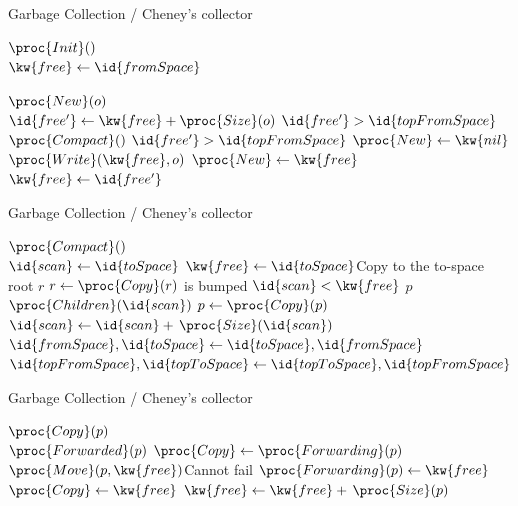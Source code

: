 \documentclass[compress,dvipdfmx]{beamer}
\begin{document}
%
\begin{frame}{Garbage Collection / Cheney's collector}

  \begin{codebox}
    \(\proc{Init}()\)\\
    \li \(\kw{free} \gets \id{fromSpace}\)
  \end{codebox}

  \begin{codebox}
    \(\proc{New}(o)\)\\
    \li \(\id{free'} \gets \kw{free} + \proc{Size}(o)\)
    \li {} \(\id{free'} > \id{topFromSpace}\)  \(\proc{Compact}()\)
    \li \If \(\id{free'} > \id{topFromSpace}\)
    \li \Then \(\proc{New} \gets \kw{nil}\)
    \li \Else \(\proc{Write}(\kw{free}, o)\)
    \li       \(\proc{New} \gets \kw{free}\)
    \li       \(\kw{free} \gets \id{free'}\)
        \End
  \end{codebox}

\end{frame}

%
\begin{frame}{Garbage Collection / Cheney's collector}

  \begin{codebox}
    \(\proc{Compact}()\)\\
    \li \(\id{scan} \gets \id{toSpace}\)
    \li \(\kw{free} \gets \id{toSpace}\)\RComment Copy to the to-space
    \li \For {} root \(r\)  \(r \gets
    \proc{Copy}(r)\)\RComment {} is bumped
    \li \While \(\id{scan} < \kw{free}\) 
    \li \> \For {} \(p\)  \(\proc{Children}(\id{scan})\) 
              \(p \gets \proc{Copy}(p)\)
    \li \> \(\id{scan} \gets \id{scan} + \, \proc{Size}(\id{scan})\)
    \li \(\id{fromSpace}, \id{toSpace} \gets \id{toSpace}, \id{fromSpace}\)
    \li \(\id{topFromSpace}, \id{topToSpace} \gets \id{topToSpace},
    \id{topFromSpace}\)
  \end{codebox}

\end{frame}

%
\begin{frame}{Garbage Collection / Cheney's collector}

  \begin{codebox}
    \(\proc{Copy}(p)\)\\
    \li \If \(\proc{Forwarded}(p)\)
    \li \Then \(\proc{Copy} \gets \proc{Forwarding}(p)\)
    \li \Else \(\proc{Move}(p, \kw{free})\)\RComment Cannot fail
    \li       \(\proc{Forwarding}(p) \gets \kw{free}\)
    \li       \(\proc{Copy} \gets \kw{free}\)
    \li       \(\kw{free} \gets \kw{free} + \, \proc{Size}(p)\)
        \End
  \end{codebox}

\end{frame}
\end{document}
